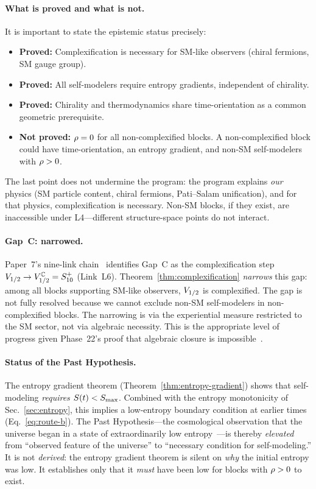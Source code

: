 \paragraph{What is proved and what is not.}
It is important to state the epistemic status precisely:
\begin{itemize}
  \item \textbf{Proved:} Complexification is necessary for SM-like
    observers (chiral fermions, SM gauge group).
  \item \textbf{Proved:} All self-modelers require entropy
    gradients, independent of chirality.
  \item \textbf{Proved:} Chirality and thermodynamics share
    time-orientation as a common geometric prerequisite.
  \item \textbf{Not proved:} $\rho = 0$ for all
    non-complexified blocks.  A non-complexified block could have
    time-orientation, an entropy gradient, and non-SM self-modelers
    with $\rho > 0$.
\end{itemize}
The last point does not undermine the program: the program explains
\emph{our} physics (SM particle content, chiral fermions,
Pati--Salam unification), and for that physics, complexification is
necessary.  Non-SM blocks, if they exist, are inaccessible under
L4---different structure-space points do not interact.

\paragraph{Gap~C: narrowed.}
Paper~7's nine-link chain~\cite{Paper7} identifies Gap~C as the
complexification step $V_{1/2} \to V_{1/2}^{\mathbb{C}} = S_{10}^+$
(Link~L6).  Theorem~\ref{thm:complexification} \emph{narrows} this
gap: among all blocks supporting SM-like observers, $V_{1/2}$ is
complexified.  The gap is not fully resolved because we cannot
exclude non-SM self-modelers in non-complexified blocks.  The
narrowing is via the experiential measure restricted to the SM
sector, not via algebraic necessity.  This is the appropriate level
of progress given Phase~22's proof that algebraic closure is
impossible~\cite{BGW2020}.

\paragraph{Status of the Past Hypothesis.}
The entropy gradient theorem
(Theorem~\ref{thm:entropy-gradient}) shows that self-modeling
\emph{requires} $S(t) < S_{\max}$.  Combined with the entropy
monotonicity of Sec.~\ref{sec:entropy}, this implies a low-entropy
boundary condition at earlier times
(Eq.~\eqref{eq:route-b}).  The Past Hypothesis---the
cosmological observation that the universe began in a state of
extraordinarily low entropy~\cite{Penrose1979,Albert2000}---is
thereby \emph{elevated} from ``observed feature of the universe'' to
``necessary condition for self-modeling.''  It is not
\emph{derived}: the entropy gradient theorem is silent on \emph{why}
the initial entropy was low.  It establishes only that it
\emph{must} have been low for blocks with $\rho > 0$ to exist.

